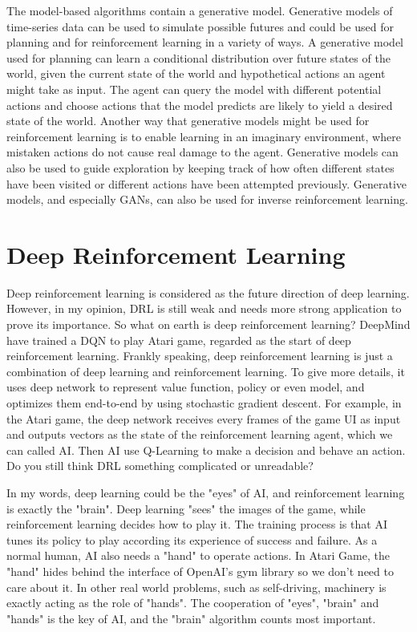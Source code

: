 \documentclass[10pt,twocolumn,letterpaper]{article}
\begin{document}
The model-based algorithms contain a generative model. Generative models of time-series data can be used to
simulate possible futures and could be used for planning and for reinforcement learning in a variety of ways. A 
generative model used for planning can learn a conditional distribution over future states of the world, given the current 
state of the world and hypothetical actions an agent might take as input. The agent can query the model with 
different potential actions and choose actions that the model predicts are likely to yield a desired state of the world. 
Another way that generative models might be used for reinforcement learning is to enable learning in an imaginary 
environment, where mistaken actions do not cause real damage to the agent. Generative models can also be used to 
guide exploration by keeping track of how often different states have been visited or different actions have been 
attempted previously. Generative models, and especially GANs, can also be used for inverse reinforcement learning. 

\section{Deep Reinforcement Learning}

Deep reinforcement learning is considered as the future direction of deep learning. However, in my opinion, DRL is still
weak and needs more strong application to prove its importance.  So what on earth is deep reinforcement learning? 
DeepMind have trained a DQN to play Atari game, regarded as the start of deep reinforcement learning. Frankly 
speaking, deep reinforcement learning is just a combination of deep learning and reinforcement learning. To give more
details, it uses deep network to represent value function, policy or even model, and optimizes them end-to-end by 
using stochastic gradient descent. For example, in the Atari game, the deep network receives every frames of the 
game UI as input and outputs vectors as the state of the reinforcement learning agent, which we can called AI. Then AI
use Q-Learning to make a decision and behave an action. Do you still think DRL something complicated or unreadable?   

In my words, deep learning could be the "eyes" of AI, and reinforcement learning is exactly the "brain". Deep learning 
"sees" the images of the game, while reinforcement learning decides how to play it. The training process is that AI tunes
its policy to play according its experience of success and failure. As a normal human, AI also needs a "hand" to operate
actions. In Atari Game, the "hand" hides behind the interface of OpenAI's gym library so we don't need to care about it. In 
other real world problems, such as self-driving, machinery is exactly acting as the role of "hands". The cooperation of "eyes", "brain" and "hands" is the key of AI, and the "brain" algorithm counts most important.
\end{document}
